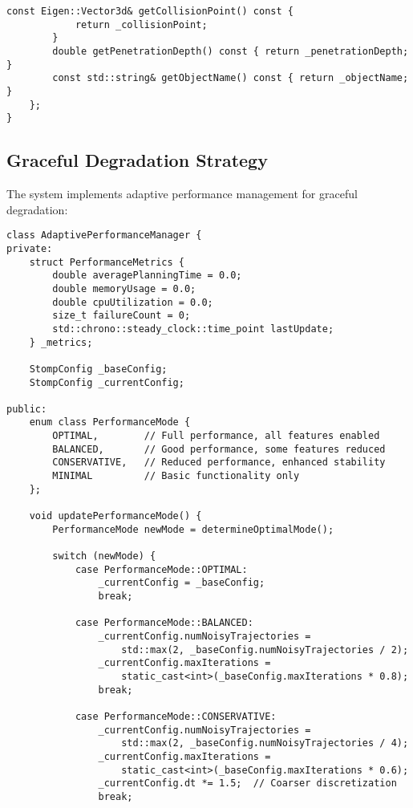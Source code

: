 \begin{lstlisting}[caption={Comprehensive Exception Hierarchy}, label={lst:exception_hierarchy}]
        const Eigen::Vector3d& getCollisionPoint() const { 
            return _collisionPoint; 
        }
        double getPenetrationDepth() const { return _penetrationDepth; }
        const std::string& getObjectName() const { return _objectName; }
    };
}
\end{lstlisting}

\subsection{Graceful Degradation Strategy}

The system implements adaptive performance management for graceful degradation:

\begin{lstlisting}[caption={Adaptive Performance Management}, label={lst:performance_management}]
class AdaptivePerformanceManager {
private:
    struct PerformanceMetrics {
        double averagePlanningTime = 0.0;
        double memoryUsage = 0.0;
        double cpuUtilization = 0.0;
        size_t failureCount = 0;
        std::chrono::steady_clock::time_point lastUpdate;
    } _metrics;
    
    StompConfig _baseConfig;
    StompConfig _currentConfig;
    
public:
    enum class PerformanceMode {
        OPTIMAL,        // Full performance, all features enabled
        BALANCED,       // Good performance, some features reduced
        CONSERVATIVE,   // Reduced performance, enhanced stability
        MINIMAL         // Basic functionality only
    };
    
    void updatePerformanceMode() {
        PerformanceMode newMode = determineOptimalMode();
        
        switch (newMode) {
            case PerformanceMode::OPTIMAL:
                _currentConfig = _baseConfig;
                break;
                
            case PerformanceMode::BALANCED:
                _currentConfig.numNoisyTrajectories = 
                    std::max(2, _baseConfig.numNoisyTrajectories / 2);
                _currentConfig.maxIterations = 
                    static_cast<int>(_baseConfig.maxIterations * 0.8);
                break;
                
            case PerformanceMode::CONSERVATIVE:
                _currentConfig.numNoisyTrajectories = 
                    std::max(2, _baseConfig.numNoisyTrajectories / 4);
                _currentConfig.maxIterations = 
                    static_cast<int>(_baseConfig.maxIterations * 0.6);
                _currentConfig.dt *= 1.5;  // Coarser discretization
                break;
                

\end{lstlisting}
